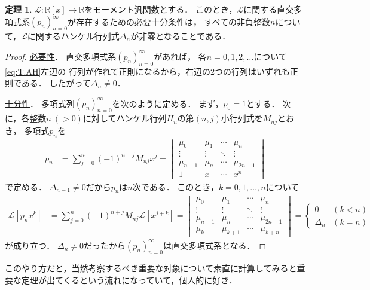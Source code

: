 \documentclass{jlreq}
\theoremstyle{definition}
\newtheorem{theorem}{定理}
\newcommand{\functype}[3]{#1\colon#2\longrightarrow#3}
\newcommand{\mcL}{\mathcal{L}}
\newcommand{\polynoms}[2]{#1[#2]}
\newcommand{\realnums}{\mathbb{R}}
\newcommand{\sequence}[3]{\sequenceparen{#1}{#2}{#3}{(}{)}} %
\newcommand{\sequenceparen}[5]{{#4#1#5}_{#2}^{#3}}
\begin{document}
\begin{theorem}
  \(\functype{\mcL}{\polynoms{\realnums}{x}}{\realnums}\)をモーメント汎関数とする．
  このとき，\(\mcL\)に関する直交多項式系\(\sequence{p_n}{n=0}{\infty}\)が存在するための必要十分条件は，
  すべての非負整数\(n\)について，\(\mcL\)に関するハンケル行列式\(\Delta_n\)が非零となることである\cite[p. 11, Theorem 3.1]{Chihara2011}．
\end{theorem}
\begin{proof}
  \underline{必要性}．
  直交多項式系\(\sequence{p_n}{n=0}{\infty}\)があれば，
  各\(n=0,1,2,\dots\)について\cref{eq:T.AH}左辺の
  行列が作れて正則になるから，右辺の2つの行列はいずれも正則である．
  したがって\(\Delta_n\neq0\)．

  \underline{十分性}．
  多項式列\(\sequence{p_n}{n=0}{\infty}\)を次のように定める．
  まず，\(p_0=1\)とする．
  次に，各整数\(n\:(>0)\)に対してハンケル行列\(H_n\)の第\((n,j)\)小行列式を\(M_{nj}\)とおき，
  多項式\(p_n\)を
  \begin{align}
    p_n &= \sum_{j=0}^n (-1)^{n+j} M_{nj} x^j
    =
    \begin{vmatrix}
      \mu_0 & \mu_1 & \cdots & \mu_n \\
      \vdots & \vdots & \ddots & \vdots \\
      \mu_{n-1} & \mu_n & \cdots & \mu_{2n-1} \\
      1 & x & \cdots & x^n
    \end{vmatrix}
  \end{align}
  で定める．
  \(\Delta_{n-1}\neq0\)だから\(p_n\)は\(n\)次である．
  このとき，\(k=0,1,\dots,n\)について
  \begin{align}
    \mcL[p_n x^k]
    &= \sum_{j=0}^n (-1)^{n+j} M_{nj} \mcL[x^{j+k}]
    =
    \begin{vmatrix}
      \mu_0 & \mu_1 & \cdots & \mu_n \\
      \vdots & \vdots & \ddots & \vdots \\
      \mu_{n-1} & \mu_n & \cdots & \mu_{2n-1} \\
      \mu_{k} & \mu_{k+1} & \cdots & \mu_{k+n}
    \end{vmatrix}
    =
    \begin{cases}
      0 & (k<n) \\
      \Delta_n & (k=n)
    \end{cases}
  \end{align}
  が成り立つ．
  \(\Delta_n\neq0\)だったから\(\sequence{p_n}{n=0}{\infty}\)は直交多項式系となる．
\end{proof}

このやり方だと，当然考察するべき重要な対象について素直に計算してみると重要な定理が出てくるという流れになっていて，個人的に好き．

\printbibliography[title={参考文献}]
\end{document}
